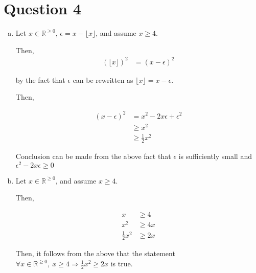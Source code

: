 \documentclass[12pt]{article}
\begin{document}
\section*{Question 4}

    \begin{enumerate}[a.]
        \item

        Let $x \in \mathbb{R}^{\geq 0}$, $\epsilon = x - \lfloor x \rfloor$, and
        assume $x \geq 4$.

        \bigskip

        Then,
        \setcounter{equation}{0}
        \begin{align}
            (\lfloor x \rfloor)^2 &= (x - \epsilon)^2
        \end{align}

        \bigskip

        by the fact that $\epsilon$ can be rewritten as $\lfloor x \rfloor = x - \epsilon$.

        \bigskip

        Then,

        \begin{align}
            (x - \epsilon)^2 &= x^2 - 2x\epsilon + \epsilon^2\\
            &\geq x^2\\
            &\geq \frac{1}{2}x^2
        \end{align}

        \bigskip

        Conclusion can be made from the above fact that $\epsilon$ is sufficiently
        small and $\epsilon^2 - 2x\epsilon \geq 0$

        \item

        Let $x \in \mathbb{R}^{\geq 0}$, and assume $x \geq 4$.

        \bigskip

        Then,

        \setcounter{equation}{0}
        \begin{align}
            x &\geq 4 \\
            x^2 &\geq 4x \\
            \frac{1}{2}x^2 &\geq 2x
        \end{align}

        \bigskip

        Then, it follows from the above that the statement $\forall x \in
        \mathbb{R}^{\geq 0},\: x \geq 4 \Rightarrow \frac{1}{2}x^2 \geq 2x$ is true.

    \end{enumerate}
\end{document}
